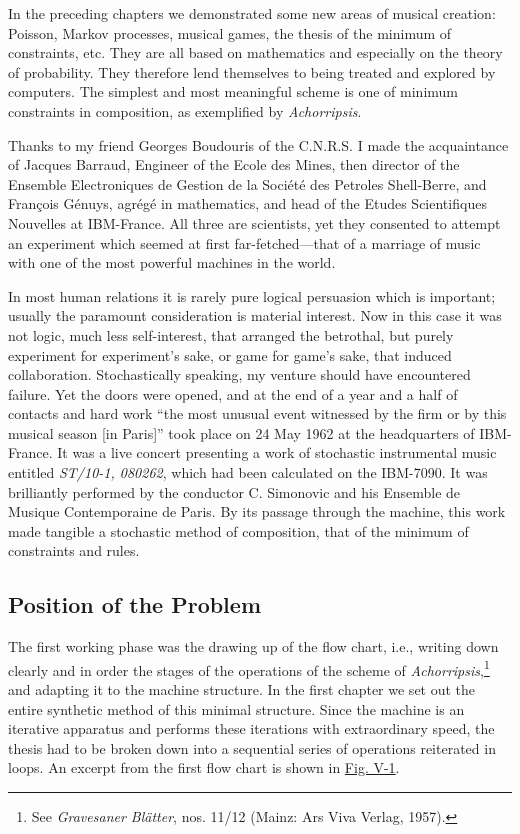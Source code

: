 \documentclass[letterpaper, 11pt]{article}
\begin{document}
In the preceding chapters we demonstrated some new areas of musical creation: Poisson, Markov processes, musical games, the thesis of the minimum of constraints, etc.
They are all based on mathematics and especially on the theory of probability.
They therefore lend themselves to being treated and explored by computers.
The simplest and most meaningful scheme is one of minimum constraints in composition, as exemplified by \textit{Achorripsis}.

Thanks to my friend Georges Boudouris of the C.N.R.S. I made the acquaintance of Jacques Barraud, Engineer of the Ecole des Mines, then director of the Ensemble Electroniques de Gestion de la Société des Petroles Shell-Berre, and François Génuys, agrégé in mathematics, and head of the Etudes Scientifiques Nouvelles at IBM-France.
All three are scientists, yet they consented to attempt an experiment which seemed at first far-fetched---that of a marriage of music with one of the most powerful machines in the world.

In most human relations it is rarely pure logical persuasion which is important; usually the paramount consideration is material interest.
Now in this case it was not logic, much less self-interest, that arranged the betrothal, but purely experiment for experiment's sake, or game for game's sake, that induced collaboration.
Stochastically speaking, my venture should have encountered failure.
Yet the doors were opened, and at the end of a year and a half of contacts and hard work ``the most unusual event witnessed by the firm or by this musical season [in Paris]'' took place on 24 May 1962 at the headquarters of IBM-France.
It was a live concert presenting a work of stochastic instrumental music entitled \textit{ST/10-1, 080262}, which had been calculated on the IBM-7090.
It was brilliantly performed by the conductor C. Simonovic and his Ensemble de Musique Contemporaine de Paris.
By its passage through the machine, this work made tangible a stochastic method of composition, that of the minimum of constraints and rules.

\subsection*{Position of the Problem}

The first working phase was the drawing up of the flow chart, i.e., writing down clearly and in order the stages of the operations of the scheme of \textit{Achorripsis},\footnote{See \textit{Gravesaner Blätter}, nos. 11/12 (Mainz: Ars Viva Verlag, 1957).} and adapting it to the machine structure.
In the first chapter we set out the entire synthetic method of this minimal structure.
Since the machine is an iterative apparatus and performs these iterations with extraordinary speed, the thesis had to be broken down into a sequential series of operations reiterated in loops.
An excerpt from the first flow chart is shown in \hyperref[fig:flow-chart]{Fig. V-1}.
\end{document}
